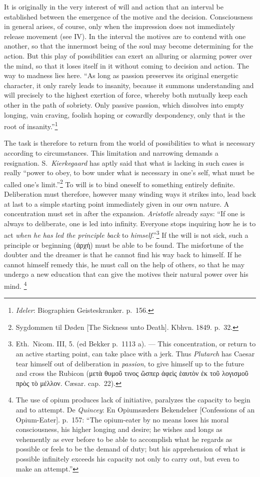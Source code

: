 \documentclass[12pt,a4paper]{book}
\newcommand{\opage}[1]{\marginnote{\footnotesize\textit{[#1]}}}
\begin{document}
It is originally in the very interest of will and action that an interval
be established between the emergence of the motive and the decision.
Consciousness in general arises, of course, only when the impression does
not immediately release movement (see IV). In the interval the motives
are to contend with one another, so that the innermost being of the soul
may become determining for the action. But this play of possibilities can
exert an alluring or alarming power over the mind, so that it loses itself
in it without coming to decision and action. The way to madness lies here.
``As long as passion preserves its
\opage{394}original energetic character, it only rarely leads to insanity,
because it summons understanding and will precisely to the highest
exertion of force, whereby both mutually keep each other in the path of
sobriety. Only passive passion, which dissolves into empty longing, vain
craving, foolish hoping or cowardly despondency, only that is the root of
insanity.''\footnote{\emph{Ideler}: Biographien Geisteskranker. p.~156.}

The task is therefore to return from the world of possibilities to what
is necessary according to circumstances. This limitation and narrowing
demands a resignation. S.~\emph{Kierkegaard} has aptly said that what is
lacking in such cases is really ``power to obey, to bow under what is
necessary in one's self, what must be called one's
limit.''\footnote{Sygdommen til Døden [The Sickness unto Death]. Kbhvn.
1849. p.~32.} To will is to bind oneself to something entirely definite.
Deliberation must therefore, however many winding ways it strikes into,
lead back at last to a simple starting point immediately given in our own
nature. A concentration must set in after the expansion. \emph{Aristotle}
already says: ``If one is always to deliberate, one is led into infinity.
Everyone stops inquiring how he is to act \emph{when he has led the
principle back} to \emph{himself}.''\footnote{Eth.\ Nicom. III, 5. (ed
Bekker p.~1113 a). --- This concentration, or return to an active
starting point, can take place with a jerk. Thus \emph{Plutarch} has
Caesar tear himself out of deliberation in \emph{passion}, to give himself
up to the future and cross the Rubicon (μετὰ θυμοῦ τινος ὥσπερ ἀφεὶς
ἑαυτὸν ἐκ τοῦ λογισμοῦ πρὸς τὸ μέλλον. Cæsar. cap.~22).} If the will is
not sick, such a principle or beginning (ἀρχή) must be able to be found.
The misfortune of the doubter and the dreamer is that he cannot find his
way back to himself. If he cannot himself remedy this, he must call on
the help of others, so that he may undergo a new education that can give
the motives their natural power over his mind.
\footnote{The use of opium produces lack of initiative, paralyzes the
capacity to begin and to attempt. De \emph{Quincey}: En Opiumsæders
Bekendelser [Confessions of an Opium-Eater]. p.~157: ``The opium-eater by
no means loses his moral consciousness, his higher longing and desire; he
wishes and longs as vehemently as ever before to be able to accomplish
what he regards as possible or feels to be the demand of duty; but his
apprehension of what is possible infinitely exceeds his capacity not only
to carry out, but even to make an attempt.''}
\end{document}

